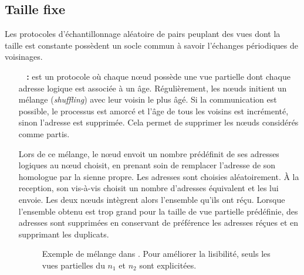 

\subsection{Taille fixe}
\label{net:subsec:fixed}

Les protocoles d'échantillonnage aléatoire de pairs peuplant des vues dont la
taille est constante possèdent un socle commun à savoir l'échanges périodiques
de voisinages.

\begin{itemize}
\item [\textbf{\CYCLON~\cite{voulgaris2005cyclon} :}] est un protocole où chaque
  nœud possède une vue partielle dont chaque adresse logique est associée à un
  âge. Régulièrement, les nœuds initient un mélange (\emph{shuffling}) avec leur
  voisin le plus âgé. Si la communication est possible, le processus est amorcé
  et l'âge de tous les voisins est incrémenté, sinon l'adresse est
  supprimée. Cela permet de supprimer les nœuds considérés comme partis.

  Lors de ce mélange, le nœud envoit un nombre prédéfinit de ses adresses
  logiques au nœud choisit, en prenant soin de remplacer l'adresse de son
  homologue par la sienne propre. Les adresses sont choisies aléatoirement. À la
  reception, son vis-à-vis choisit un nombre d'adresses équivalent et les lui
  envoie. Les deux nœuds intègrent alors l'ensemble qu'ils ont réçu. Lorsque
  l'ensemble obtenu est trop grand pour la taille de vue partielle prédéfinie,
  des adresses sont supprimées en conservant de préférence les adresses réçues
  et en supprimant les duplicats.
  
  \begin{figure}
    \centering
    \hspace{35pt}
    \caption{\label{net:fig:cyclonexample} Exemple de mélange dans \CYCLON. Pour
      améliorer la lisibilité, seuls les vues partielles du $n_1$ et $n_2$ sont
      explicitées.}
  \end{figure}
  

\end{itemize}
